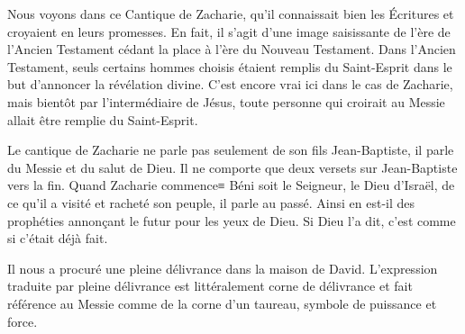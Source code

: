 

Nous voyons dans ce Cantique de Zacharie, qu'il connaissait bien les Écritures et croyaient en leurs promesses. En fait, il s'agit d'une image saisissante de l'ère de l'Ancien Testament cédant la place à l'ère du Nouveau Testament. Dans l'Ancien Testament, seuls certains hommes choisis étaient remplis du Saint-Esprit dans le but d'annoncer la révélation divine. C'est encore vrai ici dans le cas de Zacharie, mais bientôt par l'intermédiaire de Jésus, toute personne qui croirait au Messie allait être remplie du Saint-Esprit.

Le cantique de Zacharie ne parle pas seulement de son fils Jean-Baptiste, il parle du Messie et du salut de Dieu. Il ne comporte que deux versets sur Jean-Baptiste vers la fin. Quand Zacharie commence≡ \og Béni soit le Seigneur, le Dieu d’Israël, de ce qu’il a visité et racheté son peuple,\fg{} il parle au passé. Ainsi en est-il des prophéties annonçant le futur pour les yeux de Dieu. Si Dieu l'a dit, c'est comme si c'était déjà fait.

Il \og nous a procuré une pleine délivrance dans la maison de David. \fg{} L'expression traduite par \og pleine délivrance \fg{} est littéralement \og corne de délivrance \fg{} et fait référence au Messie comme de la corne d'un taureau, symbole de puissance et force.

